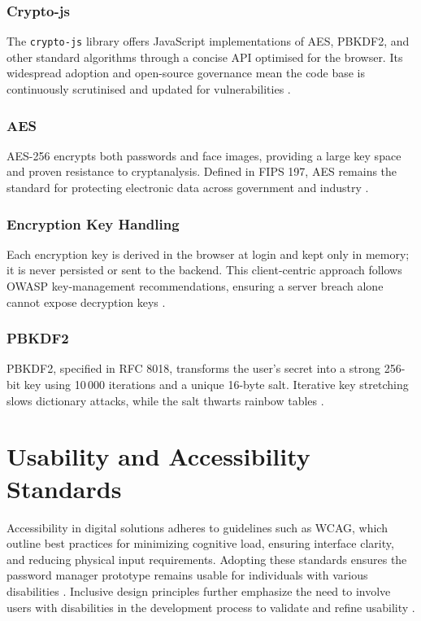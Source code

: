 \subsubsection{Crypto-js}  
The \texttt{crypto-js} library offers JavaScript implementations of AES,
PBKDF2, and other standard algorithms through a concise API optimised for the
browser.  Its widespread adoption and open-source governance mean the code
base is continuously scrutinised and updated for vulnerabilities
\autocite{CryptoJS2024}.

\subsubsection{AES}  
AES-256 encrypts both passwords and face images, providing a large key space
and proven resistance to cryptanalysis.  Defined in FIPS 197, AES remains the standard for protecting electronic data across government and
industry \autocite{NISTFIPS197}. 

\subsubsection{Encryption Key Handling}  
Each encryption key is derived in the browser at login and kept only in
memory; it is never persisted or sent to the backend.  This client-centric
approach follows OWASP key-management recommendations, ensuring a server
breach alone cannot expose decryption keys
\autocite{OWASPKeyMgmt2025}. 

\subsubsection{PBKDF2}  
PBKDF2, specified in RFC 8018, transforms the user's secret into a strong
256-bit key using 10\,000 iterations and a unique 16-byte salt.  Iterative
key stretching slows dictionary attacks, while the salt thwarts rainbow
tables \autocite{RFC8018}.

\section{Usability and Accessibility Standards}
Accessibility in digital solutions adheres to guidelines such as WCAG, which outline best practices for minimizing cognitive load, ensuring interface clarity, and reducing physical input requirements. Adopting these standards ensures the password manager prototype remains usable for individuals with various disabilities \autocite{Brewer2023}. Inclusive design principles further emphasize the need to involve users with disabilities in the development process to validate and refine usability \autocite{Lazar2015}.

